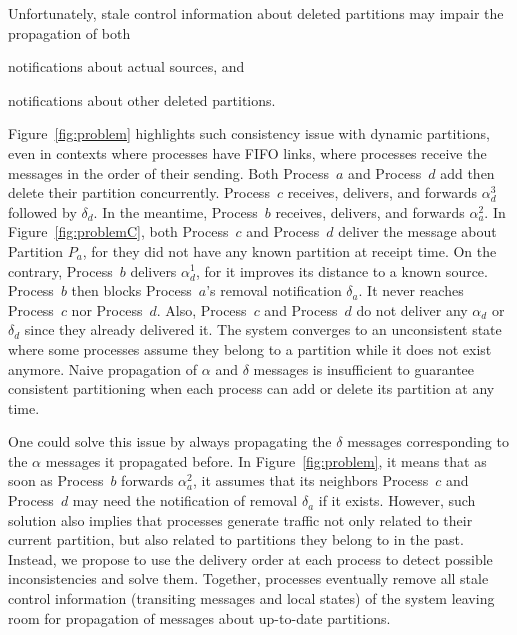 Unfortunately, stale control information about deleted partitions may
impair the propagation of both
\begin{inparaenum}[(i)]
\item notifications about actual sources, and
\item notifications about other deleted partitions.
\end{inparaenum}
Figure~\ref{fig:problem} highlights such consistency issue with
dynamic partitions, even in contexts where processes have FIFO links,
\ie where processes receive the messages in the order of their
sending. Both Process~$a$ and Process~$d$ add then delete their
partition concurrently. Process~$c$ receives, delivers, and forwards
$\alpha_d^3$ followed by $\delta_d$. In the meantime, Process~$b$
receives, delivers, and forwards $\alpha_a^2$. In
Figure~\ref{fig:problemC}, both Process~$c$ and Process~$d$ deliver
the message about Partition $P_a$, for they did not have any known
partition at receipt time. On the contrary, Process~$b$ delivers
$\alpha_d^1$, for it improves its distance to a known
source. Process~$b$ then blocks Process~$a$'s removal notification
$\delta_a$. It never reaches Process~$c$ nor Process~$d$. Also,
Process~$c$ and Process~$d$ do not deliver any $\alpha_d$ or
$\delta_d$ since they already delivered it. The system converges to an
unconsistent state where some processes assume they belong to a
partition while it does not exist anymore. Naive propagation of
$\alpha$ and $\delta$ messages is insufficient to guarantee consistent
partitioning when each process can add or delete its partition at any
time.

One could solve this issue by always propagating the $\delta$ messages
corresponding to the $\alpha$ messages it propagated before. In
Figure~\ref{fig:problem}, it means that as soon as Process~$b$
forwards $\alpha_a^2$, it assumes that its neighbors Process~$c$ and
Process~$d$ may need the notification of removal $\delta_a$ if it
exists. However, such solution also implies that processes generate
traffic not only related to their current partition, but also related
to partitions they belong to in the past. Instead, we propose to use
the delivery order at each process to detect possible inconsistencies
and solve them. Together, processes eventually remove all stale
control information (transiting messages and local states) of the
system leaving room for propagation of messages about up-to-date
partitions.


